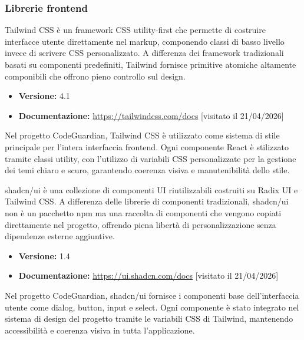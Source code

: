 \documentclass[a4paper, 11pt]{article}
\newcounter{subsubsubsection}[subsubsection]
\begin{document}
\subsubsection{Librerie frontend}

Tailwind CSS è un framework CSS utility-first che permette di costruire interfacce utente
direttamente nel markup, componendo classi di basso livello invece di scrivere CSS personalizzato.
A differenza dei framework tradizionali basati su componenti predefiniti, Tailwind fornisce
primitive atomiche altamente componibili che offrono pieno controllo sul design.
\begin{itemize}
  \item \textbf{Versione:} 4.1
  \item \textbf{Documentazione:} \url{https://tailwindcss.com/docs} [visitato il 21/04/2026]
\end{itemize}
Nel progetto CodeGuardian, Tailwind CSS è utilizzato come sistema di stile principale per
l'intera interfaccia frontend. Ogni componente React è stilizzato tramite classi utility,
con l'utilizzo di variabili CSS personalizzate per la gestione dei temi chiaro e scuro,
garantendo coerenza visiva e manutenibilità dello stile.

shadcn/ui è una collezione di componenti UI riutilizzabili costruiti su Radix UI e Tailwind CSS\@.
A differenza delle librerie di componenti tradizionali, shadcn/ui non è un pacchetto npm ma
una raccolta di componenti che vengono copiati direttamente nel progetto, offrendo piena
libertà di personalizzazione senza dipendenze esterne aggiuntive.
\begin{itemize}
  \item \textbf{Versione:} 1.4
  \item \textbf{Documentazione:} \url{https://ui.shadcn.com/docs} [visitato il 21/04/2026]
\end{itemize}
Nel progetto CodeGuardian, shadcn/ui fornisce i componenti base dell'interfaccia utente
come dialog, button, input e select. Ogni componente è stato integrato nel sistema di
design del progetto tramite le variabili CSS di Tailwind, mantenendo accessibilità e
coerenza visiva in tutta l'applicazione.
\end{document}
